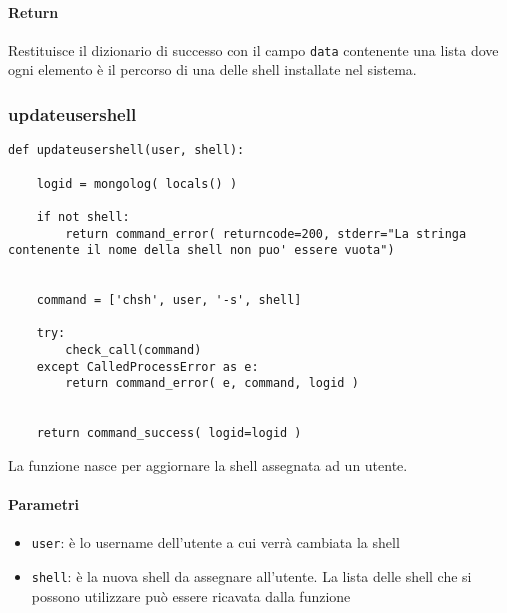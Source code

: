 \documentclass[11pt]{article}
\begin{document}
\paragraph{Return}
Restituisce il dizionario di successo con il campo \texttt{data} contenente una lista dove ogni elemento
è il percorso di una delle shell installate nel sistema.

\subsubsection{updateusershell}\label{updateusershell}
\begin{lstlisting}
def updateusershell(user, shell):
	
    logid = mongolog( locals() )
    
    if not shell:
        return command_error( returncode=200, stderr="La stringa contenente il nome della shell non puo' essere vuota")


    command = ['chsh', user, '-s', shell]
    
    try:
        check_call(command)
    except CalledProcessError as e:
        return command_error( e, command, logid )

    
    return command_success( logid=logid )
\end{lstlisting}
La funzione nasce per aggiornare la shell assegnata ad un utente. \paragraph{Parametri}
\begin{itemize}
	\item{\texttt{user}: è lo username dell'utente a cui verrà cambiata la shell}
	\item{\texttt{shell}: è la nuova shell da assegnare all'utente. La lista delle shell che si possono utilizzare
		può essere ricavata dalla funzione }
\end{itemize}
\end{document}
